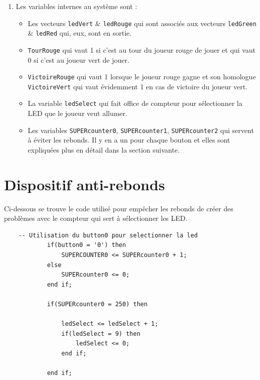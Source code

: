 \documentclass{article}
\begin{document}
\begin{enumerate}
\begin{itemize}
\begin{center}
\begin{tikzpicture}
\end{tikzpicture} \end{center}
\end{itemize}





\item Les variables internes au système sont : 
\begin{itemize}
\item Les vecteurs \texttt{ledVert} \& \texttt{ledRouge} qui sont associés aux vecteurs \texttt{ledGreen} \& \texttt{ledRed} qui, eux, sont en sortie.
\item \texttt{TourRouge} qui vaut 1 si c'est au tour du joueur rouge de jouer et qui vaut 0 si c'est au joueur vert de jouer.
\item \texttt{VictoireRouge} qui vaut 1 lorsque le joueur rouge gagne et son homologue \texttt{VictoireVert} qui vaut évidemment 1 en cas de victoire du joueur vert.
\item La variable \texttt{ledSelect} qui fait office de compteur pour sélectionner la LED que le joueur veut allumer.
\item Les variables \texttt{SUPERcounter0}, \texttt{SUPERcounter1}, \texttt{SUPERcounter2} qui servent à éviter les rebonds. Il y en a un pour chaque bouton et elles sont expliquées plus en détail dans la section suivante.
\end{itemize}



\end{enumerate}










\section{Dispositif anti-rebonds}





Ci-dessous se trouve le code utilisé pour empêcher les rebonds de créer des problèmes avec le compteur qui sert à sélectionner les LED.

\begin{lstlisting}
	-- Utilisation du button0 pour selectionner la led
			if(button0 = '0') then
				SUPERCOUNTER0 <= SUPERcounter0 + 1;
			else
				SUPERcounter0 <= 0;
			end if;

			if(SUPERcounter0 = 250) then

				ledSelect <= ledSelect + 1;
				if(ledSelect = 9) then
					ledSelect <= 0;
				end if;

			end if;
\end{lstlisting}
\end{document}
